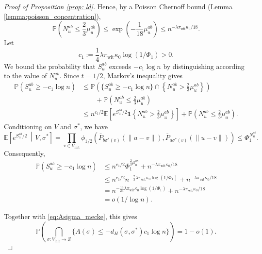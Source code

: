 \documentclass[11pt, a4paper]{amsart}
\newcommand{\1}{\mathbf{1}}
\theoremstyle{definition}
\theoremstyle{remark}
\theoremstyle{definition}
\begin{document}
\begin{proof}[Proof of Proposition \ref{prop: ld}]
Hence, by a Poisson Chernoff bound (Lemma \ref{lemma:poisson_concentration}),
\begin{equation}
\mathbb{P}\left(N_u^{ab} \le \frac{2}{3}\mu_u^{ab}\right) \le \exp\left(-\frac{1}{18} \mu_u^{ab}\right) \le n^{-\lambda \pi_{\mathrm{wit}}\kappa_0/18}.\label{eq:Nubound}
\end{equation}
Let
\[
c_1
:=
\frac14
\lambda\pi_{\mathrm{wit}}\kappa_0
\log(1/\Phi_1)>0.
\]
We bound the probability that $S_u^{ab}$ exceeds
$-c_1\log n$ by distinguishing according to the value of
$N_u^{ab}$. Since $t=1/2$, Markov's inequality gives
\begin{align}
\mathbb P(S_u^{ab}\ge -c_1\log n)
&\le
\mathbb P\left(
\{S_u^{ab}\ge -c_1\log n\}
\cap
\left\{
N_u^{ab}>\frac23\mu_u^{ab}
\right\}
\right)
\nonumber\\
&\qquad+
\mathbb P\left(
N_u^{ab}\le\frac23\mu_u^{ab}
\right)
\nonumber\\
&\le
n^{c_1/2}
\mathbb E\left[
e^{S_u^{ab}/2}
\mathbf 1\left\{
N_u^{ab}>\frac23\mu_u^{ab}
\right\}
\right]
+
\mathbb P\left(
N_u^{ab}\le\frac23\mu_u^{ab}
\right).
\label{eq:Su_bound}
\end{align}
Conditioning on $V$ and $\sigma^*$, we have
\[
\mathbb E\left[
e^{S_u^{ab}/2}
\,\middle|\,V,\sigma^*
\right]
=
\prod_{v\in V_{\mathrm{init}}}
\phi_{1/2}\left(
\bar P_{b\sigma^*(v)}(\|u-v\|),
\bar P_{a\sigma^*(v)}(\|u-v\|)
\right)
\le
\Phi_1^{N_u^{ab}}.
\]
Consequently,
\begin{align*}
\mathbb P(S_u^{ab}\ge-c_1\log n)
&\le
n^{c_1/2}
\Phi_1^{\frac23\mu_u^{ab}}
+
n^{-\lambda\pi_{\mathrm{wit}}\kappa_0/18}
\\
&\le
n^{c_1/2}
n^{-\frac23\lambda\pi_{\mathrm{wit}}\kappa_0
\log(1/\Phi_1)}
+
n^{-\lambda\pi_{\mathrm{wit}}\kappa_0/18}
\\
&=
n^{-\frac{13}{24}
\lambda\pi_{\mathrm{wit}}\kappa_0
\log(1/\Phi_1)}
+
n^{-\lambda\pi_{\mathrm{wit}}\kappa_0/18}
\\
&=
o(1/\log n).
\end{align*}

Together with \eqref{eq:Asigma_mecke}, this gives
\begin{equation}
\mathbb{P}\left( \bigcap_{\sigma: {V_{\mathrm{init}}} \to {Z}} \{ A(\sigma) \le -d_H(\sigma, \sigma^*) c_1 \log n \} \right) = 1 - o(1).
\end{equation}


\end{proof}
\end{document}
